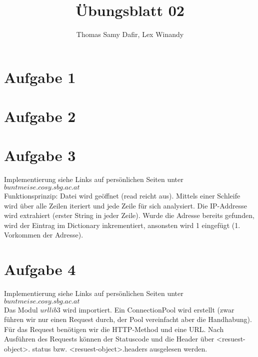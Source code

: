 \documentclass[12pt, a4paper]{report}
\title{Übungsblatt 02}
\author{Thomas Samy Dafir, Lex Winandy}
\date{}
\begin{document}
\maketitle

\section*{Aufgabe 1}




\section*{Aufgabe 2}

\section*{Aufgabe 3}

Implementierung siehe Links auf persönlichen Seiten unter $buntmeise.cosy.sbg.ac.at$\\
Funktionsprinzip: Datei wird geöffnet (read reicht aus). Mittels einer Schleife wird über alle Zeilen iteriert und jede Zeile
für sich analysiert. Die IP-Addresse wird extrahiert (erster String in jeder Zeile). Wurde die Adresse bereits gefunden, wird der Eintrag im Dictionary inkrementiert, ansonsten wird 1 eingefügt (1. Vorkommen der Adresse).

\section*{Aufgabe 4}
Implementierung siehe Links auf persönlichen Seiten unter $buntmeise.cosy.sbg.ac.at$\\
Das Modul $urllib3$ wird importiert. Ein ConnectionPool wird erstellt (zwar führen wir nur einen Request durch, der Pool vereinfacht aber die Handhabung). Für das Request benötigen wir die HTTP-Method und eine URL. Nach Ausführen des Requests können der Statuscode und die Header über <resuest-object>. status bzw. <resuest-object>.headers ausgelesen werden.
\end{document}
